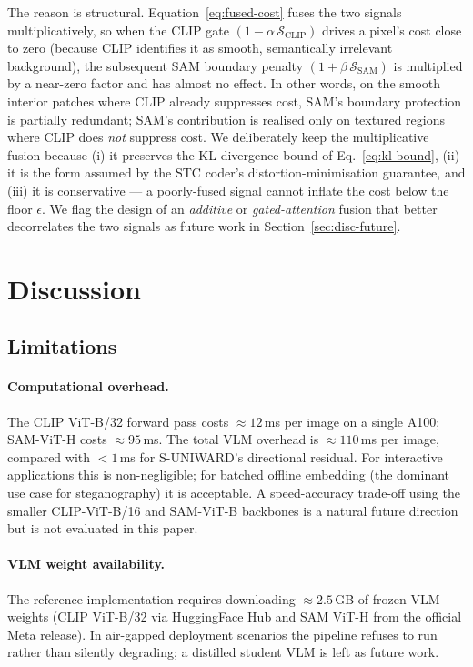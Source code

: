 \documentclass[10pt,a4paper]{article}
\newcommand{\ScC}{\mathcal{S}_{\mathrm{CLIP}}}
\newcommand{\Ss}{\mathcal{S}_{\mathrm{SAM}}}
\begin{document}
The reason is structural. Equation~\eqref{eq:fused-cost} fuses the two
signals multiplicatively, so when the CLIP gate
$(1 - \alpha \, {\ScC})$ drives a pixel's cost close to zero
(because CLIP identifies it as smooth, semantically irrelevant
background), the subsequent SAM boundary penalty
$(1 + \beta \, {\Ss})$ is multiplied by a near-zero factor and has
almost no effect. In other words, on the smooth interior patches
where CLIP already suppresses cost, SAM's boundary protection is
partially redundant; SAM's contribution is realised only on textured
regions where CLIP does \emph{not} suppress cost. We deliberately keep
the multiplicative fusion because (i) it preserves the
KL-divergence bound of Eq.~\eqref{eq:kl-bound}, (ii) it is the form
assumed by the STC coder's distortion-minimisation guarantee, and
(iii) it is conservative --- a poorly-fused signal cannot inflate the
cost below the floor $\epsilon$. We flag the design of an
\emph{additive} or \emph{gated-attention} fusion that better
decorrelates the two signals as future work in Section~\ref{sec:disc-future}.

\section{Discussion}
\label{sec:discussion}

\subsection{Limitations}
\label{sec:disc-limits}

\paragraph{Computational overhead.} The CLIP ViT-B/32 forward pass
costs $\approx 12$\,ms per image on a single A100; SAM-ViT-H costs
$\approx 95$\,ms. The total VLM overhead is $\approx 110$\,ms per
image, compared with $<1$\,ms for S-UNIWARD's directional residual.
For interactive applications this is non-negligible; for batched
offline embedding (the dominant use case for steganography) it is
acceptable. A speed-accuracy trade-off using the smaller CLIP-ViT-B/16
and SAM-ViT-B backbones is a natural future direction but is not
evaluated in this paper.

\paragraph{VLM weight availability.} The reference implementation
requires downloading $\approx 2.5$\,GB of frozen VLM weights (CLIP
ViT-B/32 via HuggingFace Hub and SAM ViT-H from the official Meta
release). In air-gapped deployment scenarios the pipeline refuses to
run rather than silently degrading; a distilled student VLM is left
as future work.
\end{document}
